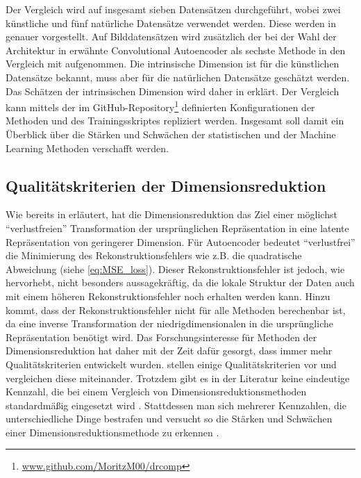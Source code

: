Der Vergleich wird auf insgesamt sieben Datensätzen durchgeführt, wobei zwei künstliche und fünf
natürliche Datensätze verwendet werden. Diese werden in
 genauer vorgestellt. Auf Bilddatensätzen wird
zusätzlich der bei der Wahl der Architektur in  erwähnte
Convolutional Autoencoder als sechste Methode in den Vergleich mit aufgenommen. Die intrinsische
Dimension ist für die künstlichen Datensätze bekannt, muss aber für die natürlichen Datensätze
geschätzt werden. Das Schätzen der intrinsischen Dimension wird daher in
 erklärt. Der Vergleich
kann mittels der im GitHub-Repository\footnote{\url{www.github.com/MoritzM00/drcomp}} definierten
Konfigurationen der Methoden und des Trainingsskriptes repliziert werden. Insgesamt soll damit ein
Überblick über die Stärken und Schwächen der statistischen und der Machine Learning Methoden
verschafft werden.

\subsection{Qualitätskriterien der Dimensionsreduktion}
\label{ch:Vergleich:sec:Methodik:subsec:Qualitaetskriterien}
Wie bereits in  erläutert, hat die Dimensionsreduktion das Ziel einer möglichst \enquote{verlustfreien} Transformation der ursprünglichen Repräsentation in eine latente Repräsentation von geringerer Dimension. Für Autoencoder bedeutet \enquote{verlustfrei} die Minimierung des Rekonstruktionsfehlers wie z.B. die quadratische Abweichung (siehe \eqref{eq:MSE_loss}). Dieser Rekonstruktionsfehler ist jedoch, wie \textcite[18]{vanderMaaten.2009} hervorhebt, nicht besonders aussagekräftig, da die lokale Struktur der Daten auch mit einem höheren Rekonstruktionsfehler noch erhalten werden kann. Hinzu kommt, dass der Rekonstruktionsfehler nicht für alle Methoden berechenbar ist, da eine inverse Transformation der niedrigdimensionalen in die ursprüngliche Repräsentation benötigt wird. Das Forschungsinteresse für Methoden der Dimensionsreduktion hat daher mit der Zeit dafür gesorgt, dass immer mehr Qualitätskriterien entwickelt wurden. \textcite{Gracia.2014} stellen einige Qualitätskriterien vor und vergleichen diese miteinander. Trotzdem gibt es in der Literatur keine eindeutige Kennzahl, die bei einem Vergleich von Dimensionsreduktionsmethoden standardmäßig eingesetzt wird \parencite[vgl.][1 -- 2]{Lee.2009}. Stattdessen man sich mehrerer Kennzahlen, die unterschiedliche
Dinge bestrafen und versucht so die Stärken und Schwächen einer Dimensionsreduktionsmethode zu
erkennen \parencite[486]{Venna.2001}.

